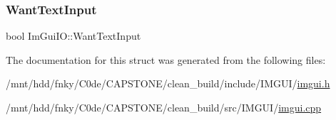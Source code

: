 \mbox{\label{structImGuiIO_a0e53197e96187a57b2d86720bf163f4d}} 
\subsubsection{\texorpdfstring{Want\+Text\+Input}{WantTextInput}}
{\footnotesize\ttfamily bool Im\+Gui\+I\+O\+::\+Want\+Text\+Input}



The documentation for this struct was generated from the following files\+:\begin{DoxyCompactItemize}
\item 
/mnt/hdd/fnky/\+C0de/\+C\+A\+P\+S\+T\+O\+N\+E/clean\+\_\+build/include/\+I\+M\+G\+U\+I/\hyperlink{imgui_8h}{imgui.\+h}\item 
/mnt/hdd/fnky/\+C0de/\+C\+A\+P\+S\+T\+O\+N\+E/clean\+\_\+build/src/\+I\+M\+G\+U\+I/\hyperlink{imgui_8cpp}{imgui.\+cpp}\end{DoxyCompactItemize}
